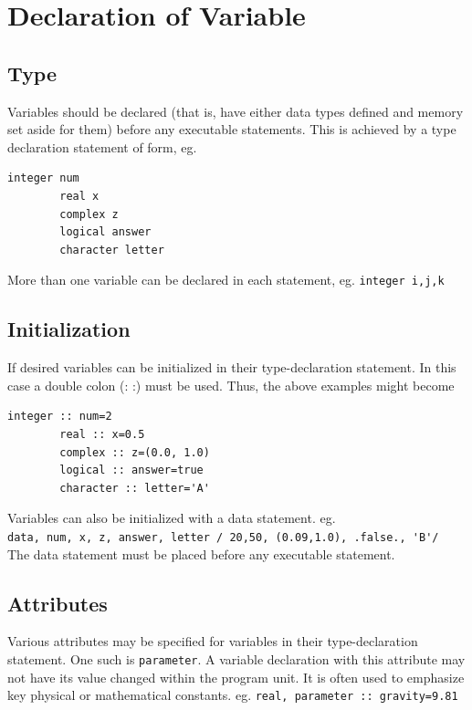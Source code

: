 \documentclass[12pt,oneside]{book}
\newcommand{\code}[1]{\lstinline[keywordstyle=\color{black},basicstyle=\ttfamily]{#1}}
\begin{document}
    \section{Declaration of Variable}
    \subsection{Type}
    Variables should be declared (that is, have either data types defined and memory set aside for them) before any executable statements. This is achieved by a type declaration statement of form, eg. \begin{lstlisting}[numbers=none]
        integer num
        real x
        complex z
        logical answer
        character letter
    \end{lstlisting}
    More than one variable can be declared in each statement, eg. \code{integer i,j,k}
    \subsection{Initialization}
    If desired variables can be initialized in their type-declaration statement.
    In this case a double colon (: :) must be used.
    Thus, the above examples might become
    \begin{lstlisting}[numbers=none]
        integer :: num=2
        real :: x=0.5
        complex :: z=(0.0, 1.0)
        logical :: answer=true
        character :: letter='A'
    \end{lstlisting}
    Variables can also be initialized with a data statement. eg.\\ \lstinline[basicstyle=\ttfamily]{data, num, x, z, answer, letter / 20,50, (0.09,1.0), .false., 'B'/}\\
    The data statement must be placed before any executable statement.
    \subsection{Attributes}
    Various attributes may be specified for variables in their type-declaration statement. 
    One such is \code{parameter}.
    A variable declaration with this attribute may not have its value changed within the program unit. 
    It is often used to emphasize key physical or mathematical constants. eg. \code{real, parameter :: gravity=9.81}
\end{document}
